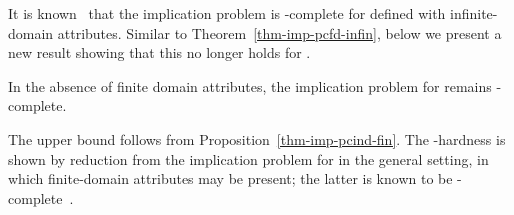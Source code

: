 It is known~\cite{CINDs} that the implication problem is
\PSPACE-complete for \CINDs defined with infinite-domain
attributes. Similar to
Theorem~\ref{thm-imp-pcfd-infin}, below we present a new result
showing that this no longer holds for \pCINDs.


\begin{theorem}
\label{thm-imp-pcind-infin} In the absence of finite domain
attributes, the implication problem for \pCINDs remains
\EXPTIME-complete. \eop
\end{theorem}
\vspace{-1ex}

\proofs The \EXPTIME upper bound follows from
Proposition~\ref{thm-imp-pcind-fin}. The \EXPTIME-hardness is
shown by reduction from the implication problem for \CINDs in the
general setting, in which finite-domain attributes may be present;
the latter is known to be \EXPTIME-complete~\cite{CINDs}. \eop


